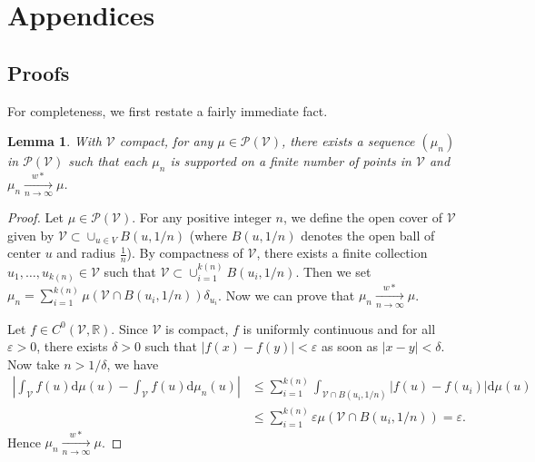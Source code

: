 \documentclass[a4paper]{article}
\newtheorem{lemma}[theorem]{Lemma}
\theoremstyle{definition}
\theoremstyle{remark}
\newcommand{\R}{\mathbb{R}}
\newcommand{\diff}{\mathrm{d}}
\newcommand{\V}{\mathcal{V}}
\renewcommand{\P}{\mathcal{P}}
\begin{document}




\appendix
\section{Appendices}
\subsection{Proofs}

For completeness, we first restate a fairly immediate fact. 
\begin{lemma}
With $\V$ compact, for any $\mu\in \P(\V)$, there exists a sequence $(\mu_n)$ in $\P(\V)$ such that each $\mu_n$  is supported on a finite number of points in $\V$ and $\mu_n\xrightarrow[n\to\infty]{w*}\mu$.
\end{lemma}
\begin{proof}
Let $\mu\in \P(\V)$.
For any positive integer $n$, we define the open cover of $\V$ given by $\V\subset \cup_{u\in V} B(u,1/n)$ (where $B(u,1/n)$ denotes the open ball of center $u$ and radius $\frac{1}{n}$). By compactness of $\V$, there exists a finite collection $u_1,\dots, u_{k(n)}\in \V$ such that $\V\subset \cup_{i=1}^{k(n)} B(u_i,1/n)$. Then we set $\mu_n=\sum_{i=1}^{k(n)} \mu(\V\cap B(u_i,1/n))\delta_{u_i}$. Now we can prove that $\mu_n\xrightarrow[n\to \infty]{w*}\mu$.

Let $f\in C^0(\V,\R)$. Since $\V$ is compact, $f$ is uniformly continuous and for all $\varepsilon>0$, there exists $\delta>0$ such that $|f(x)-f(y)|<\varepsilon$ as soon as $|x-y|<\delta$. Now take $n>1/\delta$, we have
$$
\begin{aligned}
\left|\int_\V f(u)\diff \mu(u)-\int_\V f(u)\diff\mu_n(u)\right|
&\leq
\sum_{i=1}^{k(n)}
\int_{\V\cap B(u_i,1/n)} |f(u)-f(u_i)|\diff\mu(u)
\\
&\leq 
\sum_{i=1}^{k(n)}\varepsilon\mu(\V\cap B(u_i,1/n))
=\varepsilon.
\end{aligned}
$$
Hence $\mu_n\xrightarrow[n\to \infty]{w*}\mu$.
\end{proof}
\end{document}
